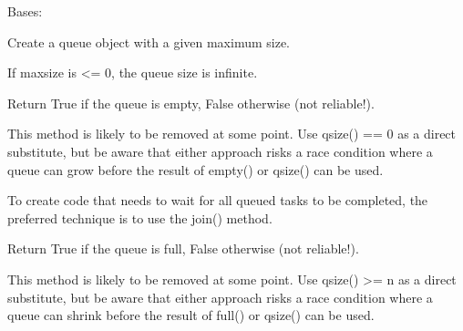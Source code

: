 \documentclass[letterpaper,10pt,english]{sphinxmanual}
\begin{document}
\begin{fulllineitems}
\label{\detokenize{modules/src.model_training.trainer:src.model_training.trainer.Queue}}
\pysigstartsignatures
\pysiglinewithargsret
{}
{}
{}
\pysigstopsignatures
\sphinxAtStartPar
Bases: 

\sphinxAtStartPar
Create a queue object with a given maximum size.

\sphinxAtStartPar
If maxsize is \textless{}= 0, the queue size is infinite.

\begin{fulllineitems}
\label{\detokenize{modules/src.model_training.trainer:src.model_training.trainer.Queue.empty}}
\pysigstartsignatures
\pysiglinewithargsret
{}
{}
{}
\pysigstopsignatures
\sphinxAtStartPar
Return True if the queue is empty, False otherwise (not reliable!).

\sphinxAtStartPar
This method is likely to be removed at some point.  Use qsize() == 0
as a direct substitute, but be aware that either approach risks a race
condition where a queue can grow before the result of empty() or
qsize() can be used.

\sphinxAtStartPar
To create code that needs to wait for all queued tasks to be
completed, the preferred technique is to use the join() method.

\end{fulllineitems}


\begin{fulllineitems}
\label{\detokenize{modules/src.model_training.trainer:src.model_training.trainer.Queue.full}}
\pysigstartsignatures
\pysiglinewithargsret
{}
{}
{}
\pysigstopsignatures
\sphinxAtStartPar
Return True if the queue is full, False otherwise (not reliable!).

\sphinxAtStartPar
This method is likely to be removed at some point.  Use qsize() \textgreater{}= n
as a direct substitute, but be aware that either approach risks a race
condition where a queue can shrink before the result of full() or
qsize() can be used.


\end{fulllineitems}
\end{fulllineitems}
\end{document}
